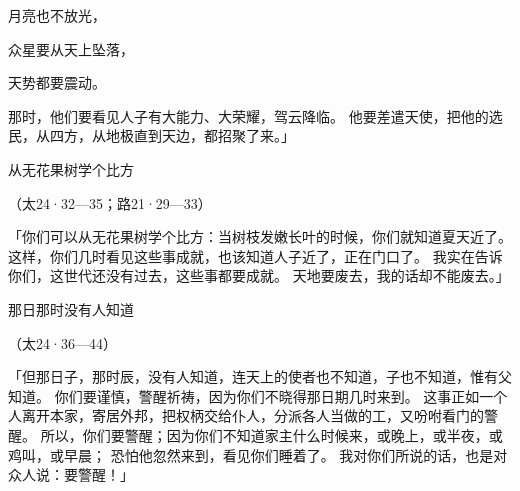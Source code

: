 {\par }{\Q 月亮也不放光，
\par }{\Q {}众星要从天上坠落，
\par }{\Q 天势都要震动。
\par }{\MM {}那时，他们要看见人子有大能力、大荣耀，驾云降临。
他要差遣天使，把他的选民，从四方，从地极直到天边，都招聚了来。」
\par }{\SH 从无花果树学个比方
\par }{\R （太24·32—35；路21·29—33）
\par }{\PP {}「你们可以从无花果树学个比方：当树枝发嫩长叶的时候，你们就知道夏天近了。
这样，你们几时看见这些事成就，也该知道人子近了，正在门口了。
我实在告诉你们，这世代还没有过去，这些事都要成就。
天地要废去，我的话却不能废去。」
\par }{\SH 那日那时没有人知道
\par }{\R （太24·36—44）
\par }{\PP {}「但那日子，那时辰，没有人知道，连天上的使者也不知道，子也不知道，惟有父知道。
你们要谨慎，警醒祈祷，因为你们不晓得那日期几时来到。
这事正如一个人离开本家，寄居外邦，把权柄交给仆人，分派各人当做的工，又吩咐看门的警醒。
所以，你们要警醒；因为你们不知道家主什么时候来，或晚上，或半夜，或鸡叫，或早晨；
恐怕他忽然来到，看见你们睡着了。
我对你们所说的话，也是对众人说：要警醒！」

}
